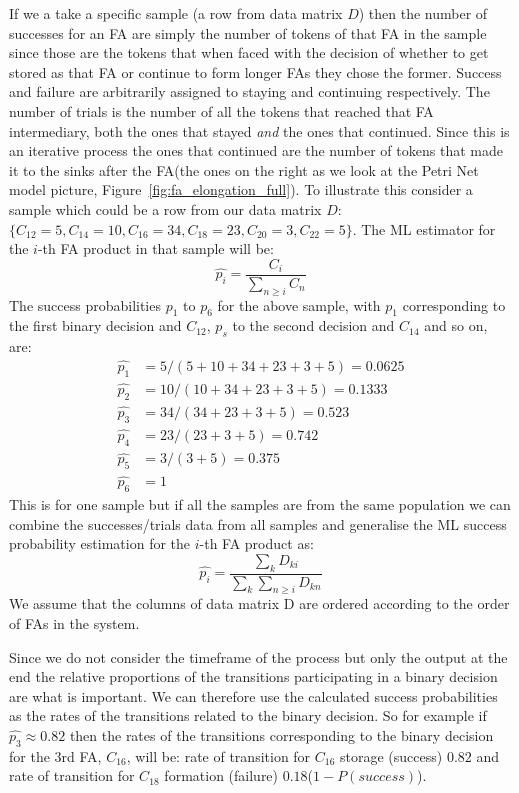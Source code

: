 If we a take a specific sample (a row from data matrix $D$) then the
number of successes for an FA are simply the number of tokens of
that FA in the sample since those are the tokens that when faced with
the decision of whether to get stored as that FA or continue to form
longer FAs they chose the former. Success and failure are arbitrarily
assigned to staying and continuing respectively. The number of trials
is the number of all the tokens that reached that FA intermediary, both
the ones that stayed \textit{and} the ones that continued. Since this
is an iterative process the ones that continued are the number of
tokens that made it to the sinks after the FA(the ones on the right as
we look at the Petri Net model picture,
Figure~\ref{fig:fa_elongation_full}). To illustrate this consider a
sample which could be a row from our data matrix $D$: $\{C_{12}=5,
C_{14}=10, C_{16}=34, C_{18}=23, C_{20}=3, C_{22}=5\}$. The ML
estimator for the $i$-th FA product in that sample will be:
\begin{equation*}
\hat{p_i} = \frac{C_i}{\sum_{n \geq i} C_n}
\end{equation*}
The success probabilities $p_1$ to $p_6$ for the above sample, with $p_1$ corresponding to
the first binary decision and $C_{12}$, $p_s$ to the second decision
and $C_{14}$ and so on, are:
\begin{align*}
\hat{p_1} & = 5/(5+10+34+23+3+5) = 0.0625\\
\hat{p_2} & = 10 / (10+34+23+3+5) = 0.1333\\
\hat{p_3} & = 34 / (34+23+3+5) = 0.523\\
\hat{p_4} & = 23 / (23+3+5) = 0.742\\
\hat{p_5} & = 3 / (3+5) = 0.375\\
\hat{p_6} & = 1
\end{align*}
This is for one sample but if all the samples are from the same
population we can combine the successes/trials data from all
samples and generalise the ML success probability estimation for the
$i$-th FA product as:
\begin{equation*}
\hat{p_i} = \frac{\sum_k D_{ki}}{\sum_k \sum_{n\geq i} D_{kn}}
\end{equation*}
We assume that the columns of data matrix D are ordered according to
the order of FAs in the system.

Since
we do not consider the timeframe of the process but  only the
output at the end the relative proportions of the transitions
participating in a binary decision are what is important. We can therefore
use the calculated success probabilities as the rates of the
transitions related to the binary decision. So for example if
$\hat{p_3}\approx0.82$ then the rates of the transitions corresponding to the
binary decision for the 3rd FA, $C_{16}$, will be: rate of transition
for $C_{16}$ storage (success) $0.82$ and rate of transition for
$C_{18}$ formation (failure) $0.18$($1-P(success)$).


